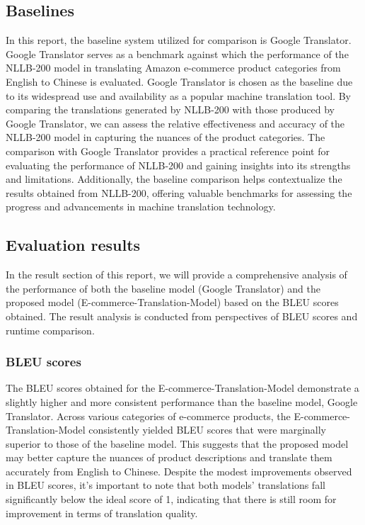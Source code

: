 \documentclass[sigconf]{acmart}
\begin{document}
\subsection{Baselines}
In this report, the baseline system utilized for comparison is Google Translator. Google Translator serves as a benchmark against which the performance of the NLLB-200 model in translating Amazon e-commerce product categories from English to Chinese is evaluated. Google Translator\cite{sutrisno_2020} is chosen as the baseline due to its widespread use and availability as a popular machine translation tool. By comparing the translations generated by NLLB-200 with those produced by Google Translator, we can assess the relative effectiveness and accuracy of the NLLB-200 model in capturing the nuances of the product categories. The comparison with Google Translator provides a practical reference point for evaluating the performance of NLLB-200 and gaining insights into its strengths and limitations. Additionally, the baseline comparison helps contextualize the results obtained from NLLB-200, offering valuable benchmarks for assessing the progress and advancements in machine translation technology.

\subsection{Evaluation results}
In the result section of this report, we will provide a comprehensive analysis of the performance of both the baseline model (Google Translator) and the proposed model (E-commerce-Translation-Model) based on the BLEU scores obtained. The result analysis is conducted from perspectives of BLEU scores and runtime comparison.

\subsubsection{BLEU scores}
The BLEU scores obtained for the E-commerce-Translation-Model demonstrate a slightly higher and more consistent performance than the baseline model, Google Translator. Across various categories of e-commerce products, the E-commerce-Translation-Model consistently yielded BLEU scores that were marginally superior to those of the baseline model. This suggests that the proposed model may better capture the nuances of product descriptions and translate them accurately from English to Chinese. Despite the modest improvements observed in BLEU scores\cite{mathur_baldwin_cohn_2020}, it's important to note that both models' translations fall significantly below the ideal score of 1, indicating that there is still room for improvement in terms of translation quality.
\end{document}

